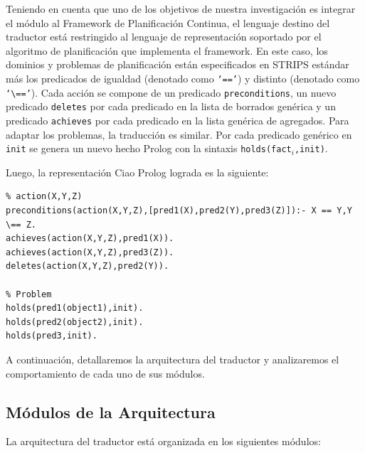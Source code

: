         Teniendo en cuenta que uno de los objetivos de nuestra investigaci\'on es
        integrar el m\'odulo al Framework de Planificaci\'on
        Continua, el lenguaje destino del traductor est\'a restringido al lenguaje
        de representaci\'on soportado por el algoritmo de
        planificaci\'on que implementa el framework.
        En este caso, los dominios y problemas de planificaci\'on est\'an
        especificados en STRIPS est\'andar m\'as los predicados
        de igualdad (denotado como \texttt{`=='}) y distinto (denotado
        como \texttt{`\textbackslash =='}).
        Cada acci\'on se compone de un
        predicado \texttt{preconditions}, un nuevo
        predicado \texttt{deletes} por cada predicado en
        la lista de borrados gen\'erica y un predicado \texttt{achieves}
        por cada predicado en la lista gen\'erica de
        agregados.
        Para adaptar los problemas, la traducci\'on es similar. Por cada
        predicado gen\'erico en \texttt{init} se genera un nuevo hecho
        Prolog con la sintaxis \texttt{holds(fact$_{i}$,init)}. 

        Luego, la representaci\'on Ciao Prolog lograda es la siguiente:

        \begin{verbatim}
% action(X,Y,Z)
preconditions(action(X,Y,Z),[pred1(X),pred2(Y),pred3(Z)]):- X == Y,Y \== Z.
achieves(action(X,Y,Z),pred1(X)).
achieves(action(X,Y,Z),pred3(Z)).
deletes(action(X,Y,Z),pred2(Y)).

% Problem
holds(pred1(object1),init).
holds(pred2(object2),init).
holds(pred3,init).
        \end{verbatim}  
        

        A continuaci\'on, detallaremos la
        arquitectura del traductor y analizaremos el comportamiento de
        cada uno de sus m\'odulos.


	\subsection{M\'odulos de la Arquitectura} \label{cap5:modarq}
	
	La arquitectura del traductor est\'a organizada en los
        siguientes m\'odulos:
	
